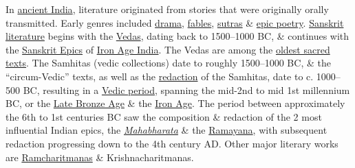 \documentclass[oneside]{book}
\numberwithin{equation}{section}
\begin{document}
In \href{https://en.wikipedia.org/wiki/Indian_literature#In_archaic_Indian_languages}{ancient India}, literature originated from stories that were originally orally transmitted. Early genres included \href{https://en.wikipedia.org/wiki/Sanskrit_drama}{drama}, \href{https://en.wikipedia.org/wiki/Panchatantra}{fables}, \href{https://en.wikipedia.org/wiki/S%C5%ABtra}{sutras} \& \href{https://en.wikipedia.org/wiki/Indian_epic_poetry}{epic poetry}. \href{https://en.wikipedia.org/wiki/Sanskrit_literature}{Sanskrit literature} begins with the \href{https://en.wikipedia.org/wiki/Vedas}{Vedas}, dating back to 1500--1000 BC, \& continues with the \href{https://en.wikipedia.org/wiki/Sanskrit_Epics}{Sanskrit Epics} of \href{https://en.wikipedia.org/wiki/Iron_Age_India}{Iron Age India}. The Vedas are among the \href{https://en.wikipedia.org/wiki/Ancient_literature}{oldest sacred texts}. The Samhitas (vedic collections) date to roughly 1500--1000 BC, \& the ``circum-Vedic'' texts, as well as the \href{https://en.wikipedia.org/wiki/Shakha}{redaction} of the Samhitas, date to c. 1000--500 BC, resulting in a \href{https://en.wikipedia.org/wiki/Vedic_period}{Vedic period}, spanning the mid-2nd to mid 1st millennium BC, or the \href{https://en.wikipedia.org/wiki/Bronze_Age}{Late Bronze Age} \& the \href{https://en.wikipedia.org/wiki/Iron_Age_India}{Iron Age}. The period between approximately the 6th to 1st centuries BC saw the composition \& redaction of the 2 most influential Indian epics, the \href{https://en.wikipedia.org/wiki/Mahabharata}{\textit{Mahabharata}} \& the \href{https://en.wikipedia.org/wiki/Ramayana}{Ramayana}, with subsequent redaction progressing down to the 4th century AD. Other major literary works are \href{https://en.wikipedia.org/wiki/Ramcharitmanas}{Ramcharitmanas} \& Krishnacharitmanas.
\end{document}
